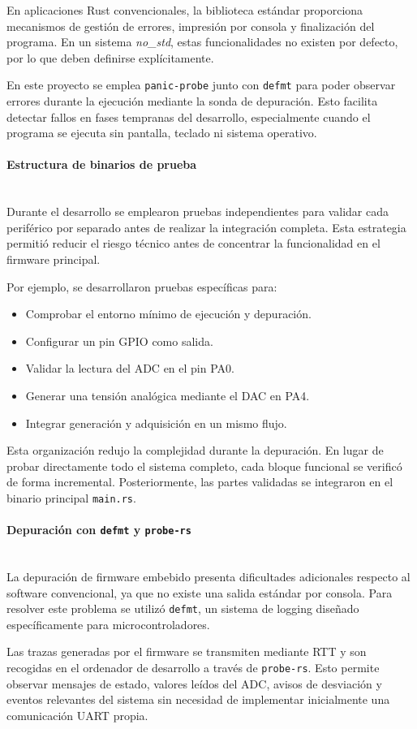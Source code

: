 \documentclass[11pt,a4paper]{article}
\newcommand{\myparagraph}[1]{\paragraph{#1}\mbox{}\\}
\begin{document}
En aplicaciones Rust convencionales, la biblioteca estándar proporciona mecanismos de gestión de errores, impresión por consola y finalización del programa. En un sistema \textit{no\_std}, estas funcionalidades no existen por defecto, por lo que deben definirse explícitamente.

En este proyecto se emplea \texttt{panic-probe} junto con \texttt{defmt} para poder observar errores durante la ejecución mediante la sonda de depuración. Esto facilita detectar fallos en fases tempranas del desarrollo, especialmente cuando el programa se ejecuta sin pantalla, teclado ni sistema operativo.

\myparagraph{Estructura de binarios de prueba}

Durante el desarrollo se emplearon pruebas independientes para validar cada periférico por separado antes de realizar la integración completa. Esta estrategia permitió reducir el riesgo técnico antes de concentrar la funcionalidad en el firmware principal.

Por ejemplo, se desarrollaron pruebas específicas para:

\begin{itemize}
    \item Comprobar el entorno mínimo de ejecución y depuración.
    \item Configurar un pin GPIO como salida.
    \item Validar la lectura del ADC en el pin PA0.
    \item Generar una tensión analógica mediante el DAC en PA4.
    \item Integrar generación y adquisición en un mismo flujo.
\end{itemize}

Esta organización redujo la complejidad durante la depuración. En lugar de probar directamente todo el sistema completo, cada bloque funcional se verificó de forma incremental. Posteriormente, las partes validadas se integraron en el binario principal \texttt{main.rs}.

\myparagraph{Depuración con \texttt{defmt} y \texttt{probe-rs}}

La depuración de firmware embebido presenta dificultades adicionales respecto al software convencional, ya que no existe una salida estándar por consola. Para resolver este problema se utilizó \texttt{defmt}, un sistema de logging diseñado específicamente para microcontroladores.

Las trazas generadas por el firmware se transmiten mediante RTT y son recogidas en el ordenador de desarrollo a través de \texttt{probe-rs}. Esto permite observar mensajes de estado, valores leídos del ADC, avisos de desviación y eventos relevantes del sistema sin necesidad de implementar inicialmente una comunicación UART propia.
\end{document}
